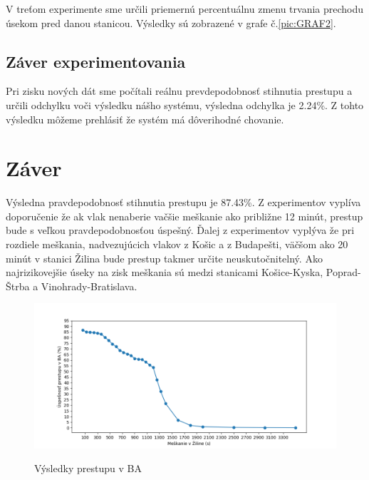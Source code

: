 \documentclass[11pt,a4paper]{article}
\begin{document}
V treťom experimente sme určili priemernú percentuálnu zmenu trvania prechodu úsekom pred danou stanicou.
Výsledky sú zobrazené v grafe č.\ref{pic:GRAF2}.

\subsection{Záver experimentovania}
\label{sec:ZAVEREXP}

Pri zisku nových dát sme počítali reálnu prevdepodobnosť stihnutia prestupu a určili odchylku voči výsledku nášho systému, výsledna odchylka je 2.24\%.
Z tohto výsledku môžeme prehlásiť že systém má dôverihodné chovanie.

\section{Záver}
\label{sec:ZAVER}

Výsledna pravdepodobnosť stihnutia prestupu je 87.43\%.
Z experimentov vyplíva doporučenie že ak vlak nenaberie vačšie meškanie ako približne 12 minút, prestup bude s veľkou pravdepodobnosťou úspešný.
Ďalej z experimentov vyplýva že pri rozdiele meškania, nadvezujúcich vlakov z Košic a z Budapešti, väčšom ako 20 minút v stanici Žilina bude prestup takmer určite neuskutočnitelný.
Ako najrizikovejšie úseky na zisk meškania sú medzi stanicami Košice-Kyska, Poprad-Štrba a Vinohrady-Bratislava.

\begin{figure}[H]
    \begin{center}
    \scalebox{0.7}
    {
        \includegraphics{Figure_1.png}
    }
    \caption{Výsledky prestupu v BA}
    \label{pic:GRAF1}
    \end{center}
\end{figure}
\end{document}

